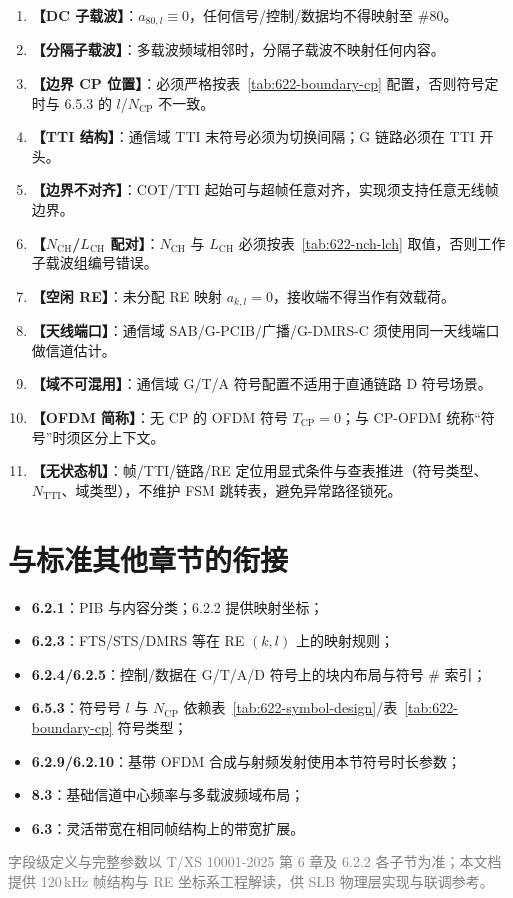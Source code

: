 \documentclass[11pt,a4paper]{ctexart}
\begin{document}
\begin{enumerate}[nosep]
  \item \textbf{【DC 子载波】}：$a_{80,l}\equiv 0$，任何信号/控制/数据均不得映射至 \#80。
  \item \textbf{【分隔子载波】}：多载波频域相邻时，分隔子载波不映射任何内容。
  \item \textbf{【边界 CP 位置】}：必须严格按表~\ref{tab:622-boundary-cp} 配置，否则符号定时与 6.5.3 的 $l$/$N_{\mathrm{CP}}$ 不一致。
  \item \textbf{【TTI 结构】}：通信域 TTI 末符号必须为切换间隔；G 链路必须在 TTI 开头。
  \item \textbf{【边界不对齐】}：COT/TTI 起始可与超帧任意对齐，实现须支持任意无线帧边界。
  \item \textbf{【$N_{\mathrm{CH}}$/$L_{\mathrm{CH}}$ 配对】}：$N_{\mathrm{CH}}$ 与 $L_{\mathrm{CH}}$ 必须按表~\ref{tab:622-nch-lch} 取值，否则工作子载波组编号错误。
  \item \textbf{【空闲 RE】}：未分配 RE 映射 $a_{k,l}{=}0$，接收端不得当作有效载荷。
  \item \textbf{【天线端口】}：通信域 SAB/G-PCIB/广播/G-DMRS-C 须使用同一天线端口做信道估计。
  \item \textbf{【域不可混用】}：通信域 G/T/A 符号配置不适用于直通链路 D 符号场景。
  \item \textbf{【OFDM 简称】}：无 CP 的 OFDM 符号 $T_{\mathrm{CP}}{=}0$；与 CP-OFDM 统称``符号''时须区分上下文。
  \item \textbf{【无状态机】}：帧/TTI/链路/RE 定位用显式条件与查表推进（符号类型、$N_{\mathrm{TTI}}$、域类型），不维护 FSM 跳转表，避免异常路径锁死。
\end{enumerate}

\section{与标准其他章节的衔接}

\begin{itemize}[nosep]
  \item \textbf{6.2.1}：PIB 与内容分类；6.2.2 提供映射坐标；
  \item \textbf{6.2.3}：FTS/STS/DMRS 等在 RE $(k,l)$ 上的映射规则；
  \item \textbf{6.2.4/6.2.5}：控制/数据在 G/T/A/D 符号上的块内布局与符号 \# 索引；
  \item \textbf{6.5.3}：符号号 $l$ 与 $N_{\mathrm{CP}}$ 依赖表~\ref{tab:622-symbol-design}/表~\ref{tab:622-boundary-cp} 符号类型；
  \item \textbf{6.2.9/6.2.10}：基带 OFDM 合成与射频发射使用本节符号时长参数；
  \item \textbf{8.3}：基础信道中心频率与多载波频域布局；
  \item \textbf{6.3}：灵活带宽在相同帧结构上的带宽扩展。
\end{itemize}

\vfill
\begin{center}
\small\textcolor{gray}{字段级定义与完整参数以 T/XS 10001-2025 第 6 章及 6.2.2 各子节为准；本文档提供 120\,kHz 帧结构与 RE 坐标系工程解读，供 SLB 物理层实现与联调参考。}
\end{center}
\end{document}
